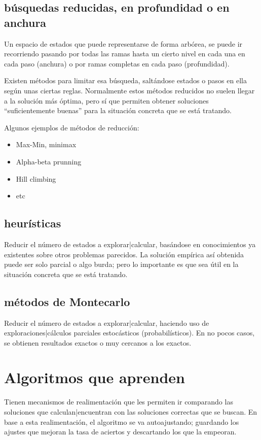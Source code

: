 \documentclass[spanish,12pt,a4paper,final,oneside]{book}
\begin{document}
\subsection{búsquedas reducidas, en profundidad o en anchura}
Un espacio de estados que puede representarse de forma arbórea, se puede ir recorriendo pasando por todas las ramas hasta un cierto nivel en cada una en cada paso (anchura) o por ramas completas en cada paso (profundidad).

Existen métodos para limitar esa búsqueda, saltándose estados o pasos en ella según unas ciertas reglas. Normalmente estos métodos reducidos no suelen llegar a la solución más óptima, pero sí que permiten obtener soluciones ``suficientemente buenas'' para la situación concreta que se está tratando.

Algunos ejemplos de métodos de reducción:
\begin{itemize}
\item Max-Min, minimax
\item Alpha-beta prunning
\item Hill climbing
\item etc
\end{itemize}

\subsection{heurísticas}
Reducir el número de estados a explorar|calcular, basándose en conocimientos ya existentes sobre otros problemas parecidos. La solución empírica así obtenida puede ser solo parcial o algo burda; pero lo importante es que sea útil en la situación concreta que se está tratando.

\subsection{métodos de Montecarlo}
Reducir el número de estados a explorar|calcular, haciendo uso de exploraciones|cálculos parciales estocásticos (probabilísticos). En no pocos casos, se obtienen resultados exactos o muy cercanos a los exactos.

\section{Algoritmos que aprenden}
Tienen mecanismos de realimentación que les permiten ir comparando las soluciones que calculan|encuentran con las soluciones correctas que se buscan. En base a esta realimentación, el algoritmo se va autoajustando; guardando los ajustes que mejoran la tasa de aciertos y descartando los que la empeoran.
\end{document}
